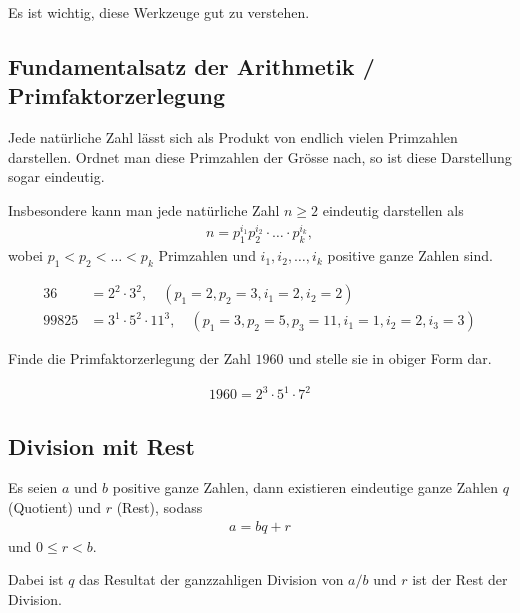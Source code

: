 Es ist wichtig, diese Werkzeuge gut zu verstehen.

\subsection{Fundamentalsatz der Arithmetik / Primfaktorzerlegung}
Jede natürliche Zahl lässt sich als Produkt von endlich vielen Primzahlen darstellen. Ordnet man diese Primzahlen der Grösse nach, so ist diese Darstellung sogar eindeutig.

Insbesondere kann man jede natürliche Zahl $n\geq 2$ eindeutig darstellen als
\begin{align}
	n = p_{1}^{i_1}p_{2}^{i_2}\cdot \ldots \cdot p_{k}^{i_k},
\end{align}
wobei $p_1<p_2<\ldots <p_k$ Primzahlen und $i_1, i_2, \ldots , i_k$ positive ganze Zahlen sind.

\begin{myexample}
\begin{align*}
	36    & = 2^2\cdot 3^2, \quad (p_1 = 2, p_2 = 3, i_1 = 2, i_2 = 2)                               \\
	99825 & = 3^1\cdot 5^2 \cdot 11^3, \quad (p_1 = 3, p_2 = 5, p_3 = 11, i_1 = 1, i_2 = 2, i_3 = 3)
\end{align*}
\end{myexample}

\begin{myexercise}
	Finde die Primfaktorzerlegung der Zahl $1960$ und stelle sie in obiger Form dar.
	\begin{myanswer}
		\begin{align*}
			1960 = 2^3\cdot 5^1\cdot 7^2
		\end{align*}
	\end{myanswer}
\end{myexercise}

\subsection{Division mit Rest}

Es seien $a$ und $b$ positive ganze Zahlen, dann existieren eindeutige ganze Zahlen $q$ (Quotient) und $r$ (Rest), sodass
\begin{align}\label{eq:divisionMitRest}
	a = bq + r
\end{align}
und $0\leq r < b$.

Dabei ist $q$ das Resultat der ganzzahligen Division von $a / b$ und $r$ ist der Rest der Division.

